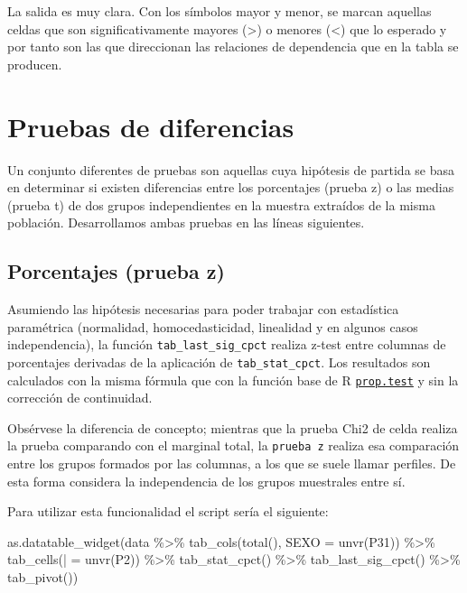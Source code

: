 \documentclass[
]{book}
\newenvironment{Shaded}{\begin{snugshade}}{\end{snugshade}}
\newcommand{\AttributeTok}[1]{\textcolor[rgb]{0.77,0.63,0.00}{#1}}
\newcommand{\FunctionTok}[1]{\textcolor[rgb]{0.00,0.00,0.00}{#1}}
\newcommand{\NormalTok}[1]{#1}
\newcommand{\OtherTok}[1]{\textcolor[rgb]{0.56,0.35,0.01}{#1}}
\newcommand{\SpecialCharTok}[1]{\textcolor[rgb]{0.00,0.00,0.00}{#1}}
\newcommand{\StringTok}[1]{\textcolor[rgb]{0.31,0.60,0.02}{#1}}
\begin{document}
La salida es muy clara. Con los símbolos mayor y menor, se marcan aquellas celdas que son significativamente mayores (\textgreater) o menores (\textless) que lo esperado y por tanto son las que direccionan las relaciones de dependencia que en la tabla se producen.

\hypertarget{pruebas-de-diferencias}{%
\section{Pruebas de diferencias}\label{pruebas-de-diferencias}}

Un conjunto diferentes de pruebas son aquellas cuya hipótesis de partida se basa en determinar si existen diferencias entre los porcentajes (prueba z) o las medias (prueba t) de dos grupos independientes en la muestra extraídos de la misma población. Desarrollamos ambas pruebas en las líneas siguientes.

\hypertarget{porcentajes-prueba-z}{%
\subsection{Porcentajes (prueba z)}\label{porcentajes-prueba-z}}

Asumiendo las hipótesis necesarias para poder trabajar con estadística paramétrica (normalidad, homocedasticidad, linealidad y en algunos casos independencia), la función \texttt{tab\_last\_sig\_cpct} realiza z-test entre columnas de porcentajes derivadas de la aplicación de \texttt{tab\_stat\_cpct}. Los resultados son calculados con la misma fórmula que con la función base de R \href{https://www.rdocumentation.org/packages/stats/versions/3.6.2/topics/prop.test}{\texttt{prop.test}} y sin la corrección de continuidad.

Obsérvese la diferencia de concepto; mientras que la prueba Chi2 de celda realiza la prueba comparando con el marginal total, la \texttt{prueba\ z} realiza esa comparación entre los grupos formados por las columnas, a los que se suele llamar perfiles. De esta forma considera la independencia de los grupos muestrales entre sí.

Para utilizar esta funcionalidad el script sería el siguiente:

\begin{Shaded}
\begin{Highlighting}[]
\FunctionTok{as.datatable\_widget}\NormalTok{(data }\SpecialCharTok{\%\textgreater{}\%}
  \FunctionTok{tab\_cols}\NormalTok{(}\FunctionTok{total}\NormalTok{(), }\AttributeTok{SEXO =} \FunctionTok{unvr}\NormalTok{(P31)) }\SpecialCharTok{\%\textgreater{}\%}
  \FunctionTok{tab\_cells}\NormalTok{(}\StringTok{\textasciigrave{}}\AttributeTok{|}\StringTok{\textasciigrave{}} \OtherTok{=} \FunctionTok{unvr}\NormalTok{(P2)) }\SpecialCharTok{\%\textgreater{}\%}
  \FunctionTok{tab\_stat\_cpct}\NormalTok{() }\SpecialCharTok{\%\textgreater{}\%}
  \FunctionTok{tab\_last\_sig\_cpct}\NormalTok{() }\SpecialCharTok{\%\textgreater{}\%}
  \FunctionTok{tab\_pivot}\NormalTok{())}
\end{Highlighting}
\end{Shaded}
\end{document}
